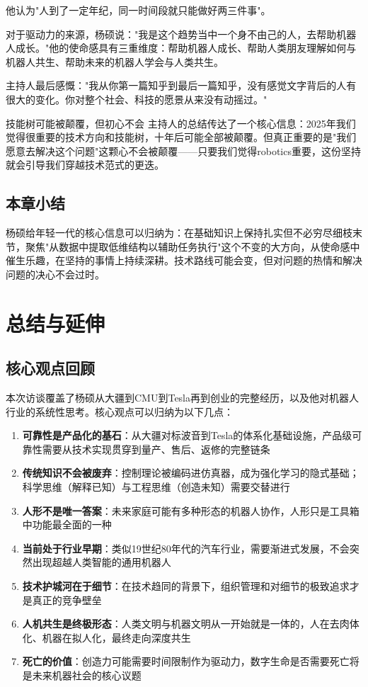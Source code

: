 \documentclass[a4paper]{article}
\begin{document}
他认为"人到了一定年纪，同一时间段就只能做好两三件事"。

对于驱动力的来源，杨硕说："我是这个趋势当中一个身不由己的人，去帮助机器人成长。"他的使命感具有三重维度：帮助机器人成长、帮助人类朋友理解如何与机器人共生、帮助未来的机器人学会与人类共生。

主持人最后感慨："我从你第一篇知乎到最后一篇知乎，没有感觉文字背后的人有很大的变化。你对整个社会、科技的愿景从来没有动摇过。"

\begin{warningbox}{技能树可能被颠覆，但初心不会}
主持人的总结传达了一个核心信息：2025年我们觉得很重要的技术方向和技能树，十年后可能全部被颠覆。但真正重要的是"我们愿意去解决这个问题"这颗心不会被颠覆——只要我们觉得robotics重要，这份坚持就会引导我们穿越技术范式的更迭。
\end{warningbox}

\subsection{本章小结}

杨硕给年轻一代的核心信息可以归纳为：在基础知识上保持扎实但不必穷尽细枝末节，聚焦"从数据中提取低维结构以辅助任务执行"这个不变的大方向，从使命感中催生乐趣，在坚持的事情上持续深耕。技术路线可能会变，但对问题的热情和解决问题的决心不会过时。


\section{总结与延伸}

\subsection{核心观点回顾}

本次访谈覆盖了杨硕从大疆到CMU到Tesla再到创业的完整经历，以及他对机器人行业的系统性思考。核心观点可以归纳为以下几点：

\begin{enumerate}
    \item \textbf{可靠性是产品化的基石}：从大疆对标波音到Tesla的体系化基础设施，产品级可靠性需要从技术实现贯穿到量产、售后、返修的完整链条
    \item \textbf{传统知识不会被废弃}：控制理论被编码进仿真器，成为强化学习的隐式基础；科学思维（解释已知）与工程思维（创造未知）需要交替进行
    \item \textbf{人形不是唯一答案}：未来家庭可能有多种形态的机器人协作，人形只是工具箱中功能最全面的一种
    \item \textbf{当前处于行业早期}：类似19世纪80年代的汽车行业，需要渐进式发展，不会突然出现超越人类智能的通用机器人
    \item \textbf{技术护城河在于细节}：在技术趋同的背景下，组织管理和对细节的极致追求才是真正的竞争壁垒
    \item \textbf{人机共生是终极形态}：人类文明与机器文明从一开始就是一体的，人在去肉体化、机器在拟人化，最终走向深度共生
    \item \textbf{死亡的价值}：创造力可能需要时间限制作为驱动力，数字生命是否需要死亡将是未来机器社会的核心议题
\end{enumerate}
\end{document}
